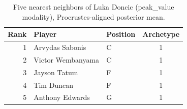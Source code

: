 \begin{table}[htbp]
  \centering\small
  \begin{tabular}{rllc}
    \toprule
    Rank & Player & Position & Archetype \\
    \midrule
    1 & Arvydas Sabonis & C & 1 \\
    2 & Victor Wembanyama & C & 1 \\
    3 & Jayson Tatum & F & 1 \\
    4 & Tim Duncan & F & 1 \\
    5 & Anthony Edwards & G & 1 \\
    \bottomrule
  \end{tabular}
  \caption{Five nearest neighbors of Luka Doncic (peak_value modality), Procrustes-aligned posterior mean.}
  \label{tab:Luka_Doncic_neighbors_peak_value}
\end{table}

